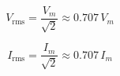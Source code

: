 \begin{multicols}{2}
\begin{CheatsheetEntryFrame}
        \begin{minipage}{0.5\columnwidth}%
            \begin{equation*}
                V_\text{rms} = \frac{V_m}{\sqrt{2}} \approx 0.707 \, V_m
            \end{equation*}
        \end{minipage}%
        \begin{minipage}{0.5\columnwidth}%
            \begin{equation*}
                I_\text{rms} = \frac{I_m}{\sqrt{2}} \approx 0.707 \, I_m
            \end{equation*}
        \end{minipage}%


        \CheatsheetEntryExtraSeparation

    \end{CheatsheetEntryFrame}

\end{multicols}%
